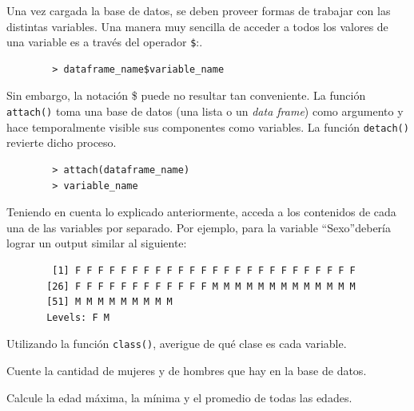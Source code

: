 \documentclass{../prob}
\begin{document}
    \begin{problema}
	Una vez cargada la base de datos, se deben proveer formas de trabajar con las distintas variables. Una manera muy sencilla de acceder a todos los valores de una variable es a través del operador \texttt{\$}:.
	\begin{verbatim}
	    > dataframe_name$variable_name	
	\end{verbatim}
Sin embargo, la notación \$ puede no resultar tan conveniente. La función \texttt{attach()} toma una base de datos (una lista o un  \textit{data frame}) como argumento y hace temporalmente visible sus componentes como variables. La función \texttt{detach()} revierte dicho proceso.
	\begin{verbatim}
	    > attach(dataframe_name)
	    > variable_name	
	\end{verbatim}        	

	\begin{parte}
    	Teniendo en cuenta lo explicado anteriormente, acceda a los contenidos de cada una de las variables por separado. Por ejemplo, para la variable \textquotedblleft Sexo\textquotedblright debería lograr un output similar al siguiente:
    	\begin{verbatim}
        [1] F F F F F F F F F F F F F F F F F F F F F F F F F
       [26] F F F F F F F F F F F F M M M M M M M M M M M M M
       [51] M M M M M M M M M
       Levels: F M
    	\end{verbatim}
    \end{parte}

	\begin{parte}
		Utilizando la función \texttt{class()}, averigue de qué clase es cada variable.   
    \end{parte}

	\begin{parte}
		Cuente la cantidad de mujeres y de hombres que hay en la base de datos.\\
		
	\noindent{}	
		
    \end{parte}
    
	\begin{parte}
		Calcule la edad máxima, la mínima y el promedio de todas las edades.\\
			
\noindent{}			

    \end{parte}    
    \end{problema}
 
\end{document}
